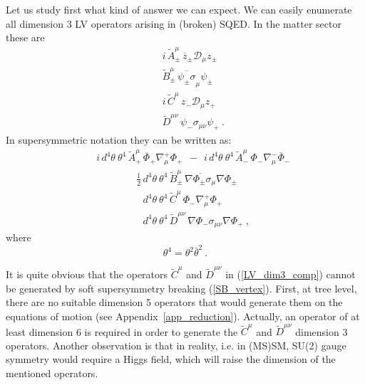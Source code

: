 \documentclass[a4paper,12pt]{article}
\begin{document}
	Let us study first what kind of answer we can expect.
	We can easily enumerate all dimension 3 LV operators
	arising in (broken) SQED. In the matter sector these
	are
\begin{eqnarray}
\nonumber
	&& i\, \widetilde{A}_\pm^\mu\, \overline{z}_\pm 
		\mathcal{D}_\mu z_\pm \\
\label{LV_dim3_comp}
	&& \widetilde{B}_\pm^\mu\, \overline{\psi_\pm\sigma}_\mu 
		   		   \psi_\pm \\
\nonumber
	&& i\, \widetilde{C}^\mu\, z_- \mathcal{D}_\mu z_+ \\
\nonumber
	&& \widetilde{D}^{\mu\nu}\, \psi_- \sigma_{\mu\nu} 
		 		    \psi_+~.
\end{eqnarray}
	In supersymmetric notation they can be written as:
\begin{eqnarray}
\nonumber
&&
	i\,  d^4\theta~ \theta^4\, \widetilde{A}_+^\mu\, 
	\overline{\Phi}_+ \nabla^+_\mu \Phi_+
	~~-~~
	i\,  d^4\theta~ \theta^4\, \widetilde{A}_-^\mu\, \Phi_- 
	                        \nabla^-_\mu 
		  	  \overline{\Phi}_-  \\
\label{LV_dim3}
&&
	\qquad
	\qquad
	\frac{1}{2}\,
	 d^4\theta~ \theta^4\, \widetilde{B}_\pm^\mu\, 
	\overline{\nabla \Phi_\pm \sigma_\mu} \nabla \Phi_\pm \\
\nonumber
&&
	\qquad
	\qquad
	\phantom{\frac{1}{2}\,}
	d^4\theta~ \theta^4\, \widetilde{C}^\mu\, 
			\Phi_- \nabla_\mu^+ \Phi_+ \\
\nonumber 
&&
	\qquad
	\qquad
	\phantom{\frac{1}{2}\,}
	d^4\theta~ \theta^4\, \widetilde{D}^{\mu\nu}\,
		\nabla \Phi_- \sigma_{\mu\nu} \nabla \Phi_+~, 
\end{eqnarray}
	where
\[
	\theta^4 = \theta^2 \bar\theta^2~.
\]

	It is quite obvious that the operators $ \widetilde{C}^\mu $
	and $ \widetilde{D}^{\mu\nu} $ in (\ref{LV_dim3_comp}) cannot
	be generated by soft supersymmetry breaking (\ref{SB_vertex}). 
	First, at tree level, there are no suitable dimension 5 operators
	that would generate them on the equations of motion
	(see Appendix~\ref{app_reduction}).
	Actually, an operator of at least dimension 6 is required 
	in order to generate the $ \widetilde{C}^\mu $
	and $ \widetilde{D}^{\mu\nu} $ dimension 3 operators.
	Another observation is that in reality, i.e. in (MS)SM, 
	SU(2) gauge symmetry would require a Higgs
	field, which will raise the dimension of the mentioned operators.
\end{document}
